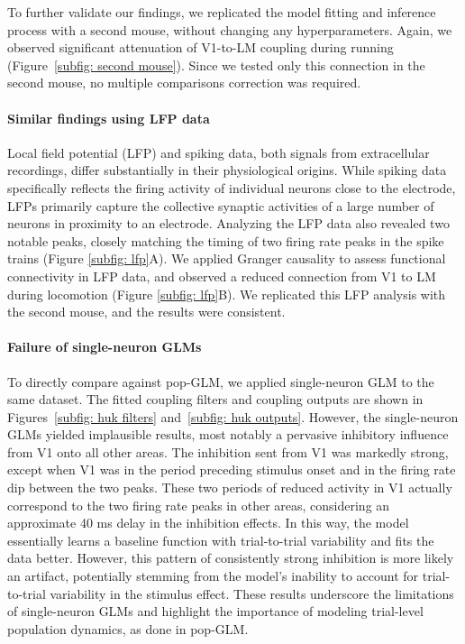 \documentclass[12pt]{article}
\begin{document}
To further validate our findings, we replicated the model fitting and inference process with a second mouse, without changing any hyperparameters. Again, we observed significant attenuation of V1-to-LM coupling during running (Figure~\ref{subfig: second mouse}). Since we tested only this connection in the second mouse, no multiple comparisons correction was required.

\paragraph{Similar findings using LFP data}
Local field potential (LFP) and spiking data, both signals from extracellular recordings, differ substantially in their physiological origins. While spiking data specifically reflects the firing activity of individual neurons close to the electrode, LFPs primarily capture the collective synaptic activities of a large number of neurons in proximity to an electrode. Analyzing the LFP data also revealed two notable peaks, closely matching the timing of two firing rate peaks in the spike trains (Figure \ref{subfig: lfp}A). We applied Granger causality to assess functional connectivity in LFP data, and observed a reduced connection from V1 to LM during locomotion (Figure \ref{subfig: lfp}B). We replicated this LFP analysis with the second mouse, and the results were consistent.

\paragraph{Failure of single-neuron GLMs}

To directly compare against pop-GLM, we applied single-neuron GLM to the same dataset. The fitted coupling filters and coupling outputs are shown in Figures~\ref{subfig: huk filters} and~\ref{subfig: huk outputs}. However, the single-neuron GLMs yielded implausible results, most notably a pervasive inhibitory influence from V1 onto all other areas. The inhibition sent from V1 was markedly strong, except when V1 was in the period preceding stimulus onset and in the firing rate dip between the two peaks. These two periods of reduced activity in V1 actually correspond to the two firing rate peaks in other areas, considering an approximate 40 ms delay in the inhibition effects. In this way, the model essentially learns a baseline function with trial-to-trial variability and fits the data better. However, this pattern of consistently strong inhibition is more likely an artifact, potentially stemming from the model's inability to account for trial-to-trial variability in the stimulus effect. These results underscore the limitations of single-neuron GLMs and highlight the importance of modeling trial-level population dynamics, as done in pop-GLM.
\end{document}
